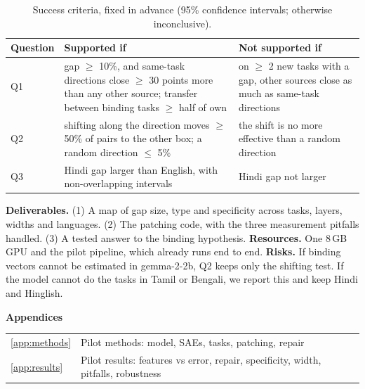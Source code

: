 \documentclass[11pt,a4paper]{article}
\makeatletter
\renewcommand\section{\@startsection{section}{1}{\z@}{-1.6ex plus -.4ex}{0.6ex}{\large\bfseries\color{accent}}}
\makeatother
\begin{document}
\begin{table}[htbp]
\centering\small
\caption{Success criteria, fixed in advance (95\% confidence intervals; otherwise inconclusive).}
\label{tab:criteria}\footnotesize
\begin{tabularx}{\linewidth}{@{}l Y Y@{}}
\toprule
Question & Supported if & Not supported if \\
\midrule
Q1 & gap $\geq$ 10\%, and same-task directions close $\geq$ 30 points more than any other source; transfer
  between binding tasks $\geq$ half of own & on $\geq$ 2 new tasks with a gap, other sources close as much as same-task
  directions \\
Q2 & shifting along the direction moves $\geq$ 50\% of pairs to the other box; a random direction $\leq$ 5\% & the
  shift is no more effective than a random direction \\
Q3 & Hindi gap larger than English, with non-overlapping intervals & Hindi gap not larger \\
\bottomrule
\end{tabularx}
\end{table}

\textbf{Deliverables.} (1) A map of gap size, type and specificity across tasks, layers, widths and languages.
(2) The patching code, with the three measurement pitfalls handled. (3) A tested answer to the binding hypothesis.
\textbf{Resources.} One 8\,GB GPU and the pilot pipeline, which already runs end to end. \textbf{Risks.} If binding
vectors cannot be estimated in gemma-2-2b, Q2 keeps only the shifting test. If the model cannot do the tasks in Tamil
or Bengali, we report this and keep Hindi and Hinglish.

{\small
\setlength{\bibsep}{1.5pt}


}

\clearpage
\appendix
\let\oldsection\section
\renewcommand{\section}{\FloatBarrier\oldsection}
\renewcommand{\thetable}{\thesection.\arabic{table}}
\renewcommand{\thefigure}{\thesection.\arabic{figure}}
\makeatletter{}\makeatother
\begin{center}{\Large\bfseries Appendices}\end{center}
\vspace{-4pt}
\begin{center}\small
\begin{tabular}{@{}l l@{}}
\ref{app:methods} & Pilot methods: model, SAEs, tasks, patching, repair \\
\ref{app:results} & Pilot results: features vs error, repair, specificity, width, pitfalls, robustness \\
\end{tabular}
\end{center}
\end{document}
